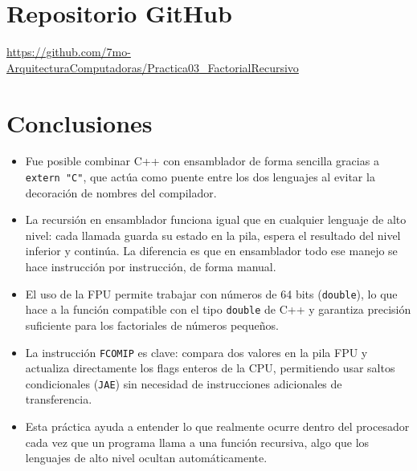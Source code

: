 \documentclass[12pt, letterpaper]{article}
\begin{document}
\section{Repositorio GitHub}

\url{https://github.com/7mo-ArquitecturaComputadoras/Practica03_FactorialRecursivo}

\section{Conclusiones}

\begin{itemize}
    \item Fue posible combinar C++ con ensamblador de forma sencilla gracias a \texttt{extern "C"}, que actúa como puente entre los dos lenguajes al evitar la decoración de nombres del compilador.
    \item La recursión en ensamblador funciona igual que en cualquier lenguaje de alto nivel: cada llamada guarda su estado en la pila, espera el resultado del nivel inferior y continúa. La diferencia es que en ensamblador todo ese manejo se hace instrucción por instrucción, de forma manual.
    \item El uso de la FPU permite trabajar con números de 64 bits (\texttt{double}), lo que hace a la función compatible con el tipo \texttt{double} de C++ y garantiza precisión suficiente para los factoriales de números pequeños.
    \item La instrucción \texttt{FCOMIP} es clave: compara dos valores en la pila FPU y actualiza directamente los flags enteros de la CPU, permitiendo usar saltos condicionales (\texttt{JAE}) sin necesidad de instrucciones adicionales de transferencia.
    \item Esta práctica ayuda a entender lo que realmente ocurre dentro del procesador cada vez que un programa llama a una función recursiva, algo que los lenguajes de alto nivel ocultan automáticamente.
\end{itemize}
\end{document}
